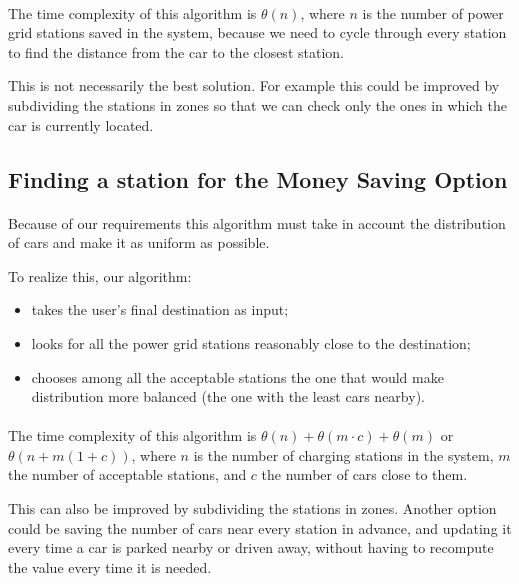 \documentclass[english]{article}
\begin{document}
\paragraph{}
The time complexity of this algorithm is $\theta(n)$, where $n$ is the number of power grid stations saved in the system, because we need to cycle through every station to find the distance from the car to the closest station.

This is not necessarily the best solution. For example this could be improved by subdividing the stations in zones so that we can check only the ones in which the car is currently located.

\newpage
\subsection{Finding a station for the Money Saving Option}

	

\paragraph{}
Because of our requirements this algorithm must take in account the distribution of cars and make it as uniform as possible.

To realize this, our algorithm:
\begin{itemize}
	\item{takes the user's final destination as input;}
	\item{looks for all the power grid stations reasonably close to the destination;}
	\item{chooses among all the acceptable stations the one that would make distribution more balanced (the one with the least cars nearby).}
\end{itemize}

\paragraph{}
The time complexity of this algorithm is $\theta(n) + \theta(m \cdot c) + \theta(m)$ or $\theta(n + m (1+c))$, where $n$ is the number of charging stations in the system, $m$ the number of acceptable stations, and $c$ the number of cars close to them.

This can also be improved by subdividing the stations in zones.
Another option could be saving the number of cars near every station in advance, and updating it every time a car is parked nearby or driven away, without having to recompute the value every time it is needed.
\end{document}

